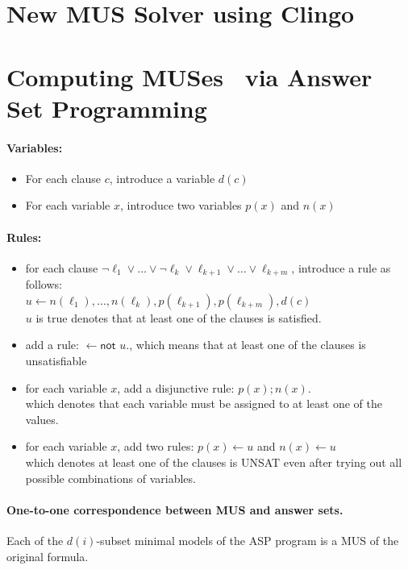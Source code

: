 \documentclass{article}
\begin{document}
\section{New MUS Solver using Clingo}
\section{Computing MUSes~\cite{LPMM2016} via Answer Set Programming}
\paragraph{Variables:}
\begin{itemize}
    \item For each clause $c$, introduce a variable $d(c)$
    \item For each variable $x$, introduce two variables $p(x)$ and $n(x)$
\end{itemize}
\paragraph{Rules:}
\begin{itemize}
    \item for each clause $\neg{\ell_1} \vee \ldots \vee 
    \neg{\ell_k} \vee \ell_{k+1} \vee \ldots \vee \ell_{k+m}$, 
    introduce a rule as follows:\\
    $u \leftarrow n(\ell_1), \ldots, n(\ell_k), p(\ell_{k+1}), p(\ell_{k+m}), d(c)$\\
    $u$ is true denotes that at least one of the clauses is satisfied.
    \item add a rule: $\leftarrow \textsf{not } u.$,
    which means that at least one of the clauses is unsatisfiable
    \item for each variable $x$, add a disjunctive rule: $p(x) ; n(x).$\\
    which denotes that each variable must be assigned to at least one of the values.
    \item for each variable $x$, add two rules: $p(x) \leftarrow u$ and $n(x) \leftarrow u$\\
    which denotes at least one of the clauses is UNSAT even after trying out all possible combinations of variables.
\end{itemize}
\paragraph{One-to-one correspondence between MUS and answer sets.}
Each of the $d(i)$-subset minimal models of the ASP program is a MUS of the original formula. 
\end{document}
